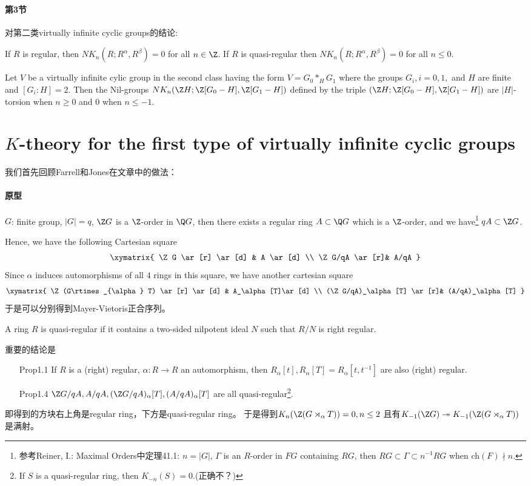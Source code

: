 \paragraph{第3节}
对第二类virtually infinite cyclic groups的结论:
\begin{theorem}[3.2]
If $R$ is regular, then $NK_n(R; R^\alpha,R^\beta) = 0 $ for all $n \in \Z$. If $R$ is
quasi-regular then $NK_n(R; R^\alpha,R^\beta) = 0 $ for all $n \leq 0$.
\end{theorem}
\begin{theorem}[3.3]
Let $V$ be a virtually infinite cylic group in the second class having
the form $V = G_0*_H G_1$
where the groups $G_i, i = 0 , 1, $ and $H$ are finite and $[G_i: H ] = 2 $. Then the Nil-groups $NK_n(\Z H ; \Z[G_0 - H ], \Z[G_1 - H ])$ defined by the triple $(\Z H ; \Z[G_0 - H ], \Z[G_1 - H ])$ are $|H|$-torsion when $n \geq 0$
and $0 $ when $ n \leq -1$.
\end{theorem}
\section{$K$-theory for the first type of virtually infinite cyclic groups}
我们首先回顾Farrell和Jones在文章中的做法：
\paragraph{原型}
$G$: finite group, $|G|=q$, $\Z G$ is a $\Z$-order in $\Q G$, then there exists a regular ring $A \subset \Q G$ which is a $\Z$-order, and we have\footnote{参考Reiner, I.: Maximal Orders中定理41.1: $n=|G|$, $\Gamma$ is an $R$-order in $FG$ containing $RG$, then $RG\subset \Gamma \subset n^{-1}RG$ when ch$(F)$$\nmid n$.} $qA\subset \Z G$. 

Hence, we have the  following Cartesian square 
\[
\xymatrix{
  \Z G \ar[r] \ar[d] & A \ar[d]  \\
  \Z G/qA \ar[r]& A/qA  }
\]
Since  $\alpha$  induces  automorphisms  of all  $4$  rings  in  this  square,  we  have  another cartesian square
\[
\xymatrix{
  \Z (G\rtimes_{\alpha} T) \ar[r] \ar[d] & A_\alpha[T]\ar[d]  \\
  (\Z G/qA)_\alpha[T] \ar[r]& (A/qA)_\alpha[T]  }
\]
于是可以分别得到Mayer-Vietoris正合序列。
\begin{definition}
A  ring $R$ is quasi-regular if it  contains a  two-sided  nilpotent ideal  $N$ 
such that $R/N $ is right  regular.
\end{definition}
重要的结论是
\begin{itemize}
	\item[Prop1.1] If $R$ is a (right) regular, $\alpha: R\longrightarrow R$ an automorphism, then $R_\alpha[t], R_\alpha[T]=R_\alpha[t,t^{-1}]$ are also (right) regular.
	\item[Prop1.4] $\Z G/qA , A/qA,(\Z G/qA)_\alpha[T] , (A/qA)_\alpha[T] $ are all quasi-regular\footnote{If $S$ is a quasi-regular ring, then $K_{-n}(S)=0$.(正确不？)}.
\end{itemize}
{\color{green}即得到的方块右上角是regular ring，下方是quasi-regular ring}。
于是得到$K_n(\Z (G\rtimes_{\alpha} T))=0, n\leq 2$ 且有$K_{-1}(\Z G)\twoheadrightarrow K_{-1}(\Z (G\rtimes_{\alpha} T))$是满射。

